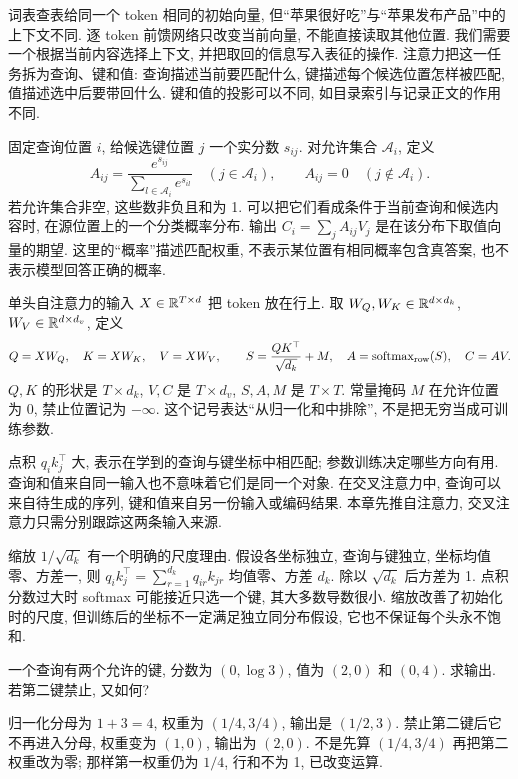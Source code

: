 \label{ch:attention}
词表查表给同一个 token 相同的初始向量, 但“苹果很好吃”与“苹果发布产品”中的上下文不同. 逐 token 前馈网络只改变当前向量, 不能直接读取其他位置. 我们需要一个根据当前内容选择上下文, 并把取回的信息写入表征的操作. 注意力把这一任务拆为查询、键和值: 查询描述当前要匹配什么, 键描述每个候选位置怎样被匹配, 值描述选中后要带回什么. 键和值的投影可以不同, 如目录索引与记录正文的作用不同.

固定查询位置 $i$, 给候选键位置 $j$ 一个实分数 $s_{ij}$. 对允许集合 $\mathcal A_i$, 定义
\[
A_{ij}=\frac{e^{s_{ij}}}{\sum_{l\in\mathcal A_i}e^{s_{il}}}\quad(j\in\mathcal A_i),
\qquad A_{ij}=0\quad(j\notin\mathcal A_i).
\]
若允许集合非空, 这些数非负且和为 1. 可以把它们看成条件于当前查询和候选内容时, 在源位置上的一个分类概率分布. 输出 $C_i=\sum_j A_{ij}V_j$ 是在该分布下取值向量的期望. 这里的“概率”描述匹配权重, 不表示某位置有相同概率包含真答案, 也不表示模型回答正确的概率.

\begin{definition}
单头自注意力的输入 $X\in\mathbb R^{T\times d}$ 把 token 放在行上. 取 $W_Q,W_K\in\mathbb R^{d\times d_k}$, $W_V\in\mathbb R^{d\times d_v}$, 定义
\[
Q=XW_Q,\quad K=XW_K,\quad V=XW_V,\qquad
S=\frac{QK^\top}{\sqrt{d_k}}+M,\quad A=\operatorname{softmax}_{\rm row}(S),\quad C=AV.
\]
$Q,K$ 的形状是 $T\times d_k$, $V,C$ 是 $T\times d_v$, $S,A,M$ 是 $T\times T$. 常量掩码 $M$ 在允许位置为 0, 禁止位置记为 $-\infty$. 这个记号表达“从归一化和中排除”, 不是把无穷当成可训练参数.
\end{definition}
点积 $q_i k_j^\top$ 大, 表示在学到的查询与键坐标中相匹配; 参数训练决定哪些方向有用. 查询和值来自同一输入也不意味着它们是同一个对象. 在交叉注意力中, 查询可以来自待生成的序列, 键和值来自另一份输入或编码结果. 本章先推自注意力, 交叉注意力只需分别跟踪这两条输入来源.

缩放 $1/\sqrt{d_k}$ 有一个明确的尺度理由\cite{attention}. 假设各坐标独立, 查询与键独立, 坐标均值零、方差一, 则 $q_i k_j^\top=\sum_{r=1}^{d_k}q_{ir}k_{jr}$ 均值零、方差 $d_k$. 除以 $\sqrt{d_k}$ 后方差为 1. 点积分数过大时 softmax 可能接近只选一个键, 其大多数导数很小. 缩放改善了初始化时的尺度, 但训练后的坐标不一定满足独立同分布假设, 它也不保证每个头永不饱和.

\begin{example}
一个查询有两个允许的键, 分数为 $(0,\log3)$, 值为 $(2,0)$ 和 $(0,4)$. 求输出. 若第二键禁止, 又如何?
\end{example}
\begin{solution}
归一化分母为 $1+3=4$, 权重为 $(1/4,3/4)$, 输出是 $(1/2,3)$. 禁止第二键后它不再进入分母, 权重变为 $(1,0)$, 输出为 $(2,0)$. 不是先算 $(1/4,3/4)$ 再把第二权重改为零; 那样第一权重仍为 $1/4$, 行和不为 1, 已改变运算.
\end{solution}


